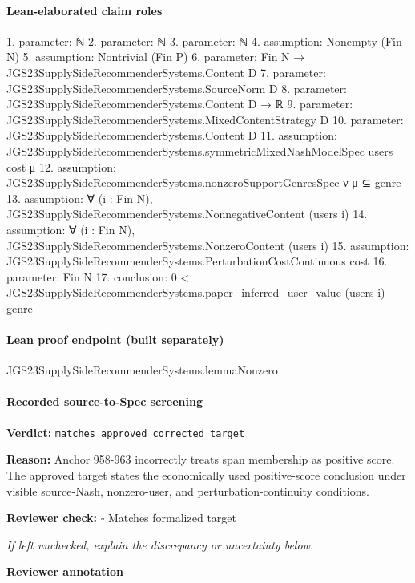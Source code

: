\documentclass[10pt]{article}
\newcommand{\reviewerbox}{%
  \par\noindent\fbox{\parbox{0.96\linewidth}{\rule{0pt}{0.38in}}}\par
}
\newcommand{\reviewmatch}[1]{%
  \par\noindent\textbf{Reviewer check:} $\square$\; #1\par
  \noindent\emph{If left unchecked, explain the discrepancy or uncertainty below.}\par
}
\begin{document}
\paragraph{Lean-elaborated claim roles}\begin{ReviewVerbatim}
1. parameter: ℕ
2. parameter: ℕ
3. parameter: ℕ
4. assumption: Nonempty (Fin N)
5. assumption: Nontrivial (Fin P)
6. parameter: Fin N → JGS23SupplySideRecommenderSystems.Content D
7. parameter: JGS23SupplySideRecommenderSystems.SourceNorm D
8. parameter: JGS23SupplySideRecommenderSystems.Content D → ℝ
9. parameter: JGS23SupplySideRecommenderSystems.MixedContentStrategy D
10. parameter: JGS23SupplySideRecommenderSystems.Content D
11. assumption: JGS23SupplySideRecommenderSystems.symmetricMixedNashModelSpec users cost μ
12. assumption: JGS23SupplySideRecommenderSystems.nonzeroSupportGenresSpec ν μ ⊆ {genre}
13. assumption: ∀ (i : Fin N), JGS23SupplySideRecommenderSystems.NonnegativeContent (users i)
14. assumption: ∀ (i : Fin N), JGS23SupplySideRecommenderSystems.NonzeroContent (users i)
15. assumption: JGS23SupplySideRecommenderSystems.PerturbationCostContinuous cost
16. parameter: Fin N
17. conclusion: 0 < JGS23SupplySideRecommenderSystems.paper_inferred_user_value (users i) genre
\end{ReviewVerbatim}

\paragraph{Lean proof endpoint (built separately)}\begin{ReviewVerbatim}
JGS23SupplySideRecommenderSystems.lemmaNonzero
\end{ReviewVerbatim}

\paragraph{Recorded source-to-Spec screening}
\textbf{Verdict:} \texttt{matches\_approved\_corrected\_target}
\\
{\raggedright
\textbf{Reason:} Anchor 958-\allowbreak{}963 incorrectly treats span membership as positive score.\allowbreak{}  The approved target states the economically used positive-\allowbreak{}score conclusion under visible source-\allowbreak{}Nash, nonzero-\allowbreak{}user, and perturbation-\allowbreak{}continuity conditions.\allowbreak{}
\par}
\reviewmatch{Matches formalized target}
\noindent\textbf{Reviewer annotation}\par
\reviewerbox
\clearpage
\hypertarget{source-claim-ff0a0ac447070dc4}{}
\end{document}
